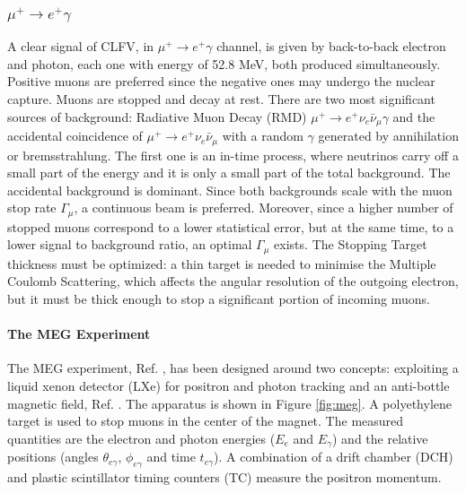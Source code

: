 \subsubsection{$\mu^+ \rightarrow e^+ \gamma$}
A clear signal of CLFV, in $\mu^+ \rightarrow e^+ \gamma$ channel, is given by back-to-back electron and photon, each one with energy of 52.8 MeV, 
both produced simultaneously. Positive muons are preferred since the negative ones may undergo the nuclear capture. 
Muons are stopped and decay at rest. There are two most significant sources of background: Radiative Muon Decay (RMD) $\mu^+ \rightarrow e^+ \nu_e \bar{\nu}_\mu \gamma$ 
and the accidental coincidence of $\mu^+ \rightarrow e^+ \nu_e \bar{\nu}_\mu$ with a random $\gamma$ 
generated by annihilation or bremsstrahlung. The first one is an in-time process, where neutrinos carry off a small part of the energy 
and it is only a small part of the total background. The accidental background is dominant. Since both backgrounds scale with the muon stop rate $\Gamma_\mu$, a continuous beam is preferred. 
Moreover, since a higher number of stopped muons correspond to a lower statistical error, but at the same time, to a lower signal to background ratio, an optimal $\Gamma_\mu$ exists.
The Stopping Target thickness must be optimized: a thin target is needed to minimise the Multiple Coulomb Scattering, which affects the angular resolution of the outgoing electron, but 
it must be thick enough to stop a significant portion of incoming muons. 
\paragraph{The MEG Experiment}
The MEG experiment, Ref. \cite{megi}, has been designed around two concepts: exploiting a liquid
xenon detector (LXe) for positron and photon tracking and an anti-bottle magnetic field, Ref. \cite{clfv_signorelli}. 
The apparatus is shown in Figure \ref{fig:meg}. A polyethylene target is used to stop muons in the center of the magnet. 
The measured quantities are the electron and photon energies ($E_e$ and $E_\gamma$) and the
relative positions (angles $\theta_{e\gamma}$, $\phi_{e\gamma}$ and time $t_{e \gamma}$).
A combination of a drift chamber (DCH) and plastic scintillator timing counters (TC) measure the positron momentum.

